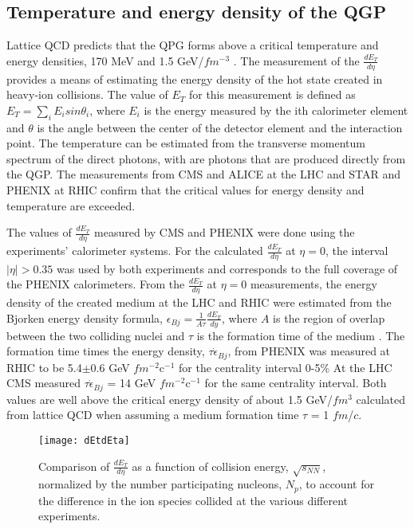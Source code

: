     \subsection{Temperature and energy density of the QGP}
      Lattice QCD predicts that the QPG forms above a critical temperature and 
        energy densities, 170 MeV and 1.5 GeV/$fm$$^{-3}$ \cite{}.
      The measurement of the $\frac{dE_{T}}{d\eta}$ provides a means of 
        estimating the energy density of the hot state created in heavy-ion
        collisions. 
      The value of $E_{T}$ for this measurement is defined as 
        $E_{T}=\sum_{i}E_{i}sin\theta_{i}$, where $E_{i}$ is the energy measured 
        by the ith calorimeter element and $\theta$ is the angle between the 
        center of the detector element and the interaction point. 
      The temperature can be estimated from the transverse momentum 
        spectrum of the direct photons, with are photons that are produced 
        directly from the QGP.
      The measurements from CMS and ALICE at the LHC and STAR and PHENIX at RHIC
        confirm that the critical values for energy density and temperature are
        exceeded.
  
      The values of $\frac{dE_{T}}{d\eta}$ measured by CMS \cite{cmsEt} and PHENIX 
        \cite{phenixDeDeta} were done using the experiments' calorimeter 
        systems.
      For the calculated $\frac{dE_{T}}{d\eta}$ at $\eta = 0$, the interval 
        $|\eta| > 0.35$ was used by both experiments and corresponds to the full
        coverage of the PHENIX calorimeters. 
      From the $\frac{dE_{T}}{d\eta}$ at $\eta = 0$ measurements, the energy 
        density of the created medium at the LHC and RHIC were estimated from the
        Bjorken energy density formula, 
      $\epsilon_{Bj}=\frac{1}{A\tau}\frac{dE_{T}}{dy}$, where $A$ is the region
        of overlap between the two colliding nuclei and $\tau$ is the formation
        time of the medium \cite{bjEdense}.
      The formation time times the energy density, $\tau\dot\epsilon_{Bj}$, 
        from PHENIX was measured at RHIC to be 5.4$\pm$0.6 GeV $fm$$^{-2}$c$^{-1}$ 
        for the centrality interval 0-5\% 
      At the LHC CMS measured $\tau\dot\epsilon_{Bj}$ = 14 GeV $fm$$^{-2}$c$^{-1}$ 
        for the same centrality interval.
      Both values are well above the critical energy density of about 1.5 GeV/$fm$$^{3}$ 
        calculated from lattice QCD when assuming a medium formation time $\tau$ 
        = 1 $fm$/$c$.
        \begin{figure}[!Hhbt]
          \centering
          \texttt{[image: dEtdEta]}
          \caption{Comparison of $\frac{dE_{T}}{d\eta}$ as a function of 
            collision energy, $\sqrt{s_{NN}}$, normalized by the number 
            participating nucleons, $N_{p}$, to account for the difference in 
            the ion species collided at the various different experiments.}
          \label{fig:dEtdEta}
        \end{figure}
  
